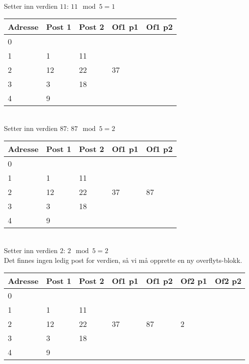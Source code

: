 ~\\
Setter inn verdien $11$: $11 \mod 5 = 1$\\
\begin{tabular}{|l|l|l|l|l|}
    \hline
    Adresse & Post 1 & Post 2 & Of1 p1 & Of1 p2 \\ \hline
    0       & ~      & ~      &\cellcolor{gray}&\cellcolor{gray}\\ \hline
    1       & 1      & 11     &\cellcolor{gray}&\cellcolor{gray}\\ \hline
    2       & 12     & 22     & 37     & ~      \\ \hline
    3       & 3      & 18     &\cellcolor{gray}&\cellcolor{gray}\\ \hline
    4       & 9      & ~      &\cellcolor{gray}&\cellcolor{gray}\\ \hline
\end{tabular}

~\\
Setter inn verdien $87$: $87 \mod 5 = 2$\\
\begin{tabular}{|l|l|l|l|l|}
    \hline
    Adresse & Post 1 & Post 2 & Of1 p1 & Of1 p2 \\ \hline
    0       & ~      & ~      &\cellcolor{gray}&\cellcolor{gray}\\ \hline
    1       & 1      & 11     &\cellcolor{gray}&\cellcolor{gray}\\ \hline
    2       & 12     & 22     & 37     & 87     \\ \hline
    3       & 3      & 18     &\cellcolor{gray}&\cellcolor{gray}\\ \hline
    4       & 9      & ~      &\cellcolor{gray}&\cellcolor{gray}\\ \hline
\end{tabular}

~\\
Setter inn verdien $2$: $2 \mod 5 = 2$\\
Det finnes ingen ledig post for verdien, så vi må opprette en ny overflyts-blokk.\\
\begin{tabular}{|l|l|l|l|l|l|l|}
    \hline
    Adresse & Post 1 & Post 2 & Of1 p1 & Of1 p2 & Of2 p1 & Of2 p2 \\ \hline
    0       & ~      & ~      &\cellcolor{gray}&\cellcolor{gray}&\cellcolor{gray}&\cellcolor{gray}\\ \hline
    1       & 1      & 11     &\cellcolor{gray}&\cellcolor{gray}&\cellcolor{gray}&\cellcolor{gray}\\ \hline
    2       & 12     & 22     & 37     & 87     & 2      & ~      \\ \hline
    3       & 3      & 18     &\cellcolor{gray}&\cellcolor{gray}&\cellcolor{gray}&\cellcolor{gray}\\ \hline
    4       & 9      & ~      &\cellcolor{gray}&\cellcolor{gray}&\cellcolor{gray}&\cellcolor{gray}\\ \hline
\end{tabular}

